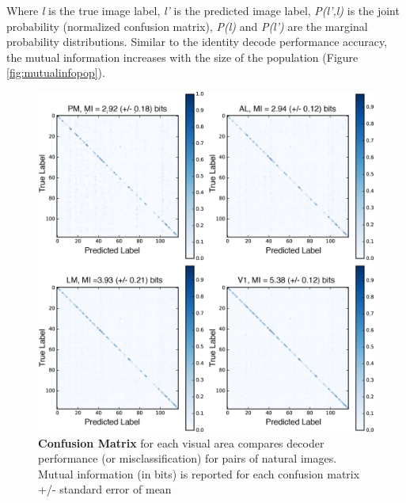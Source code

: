 Where \emph{l} is the true image label, \emph{l'} is the predicted image label, \emph{P(l',l)} is the joint probability (normalized confusion matrix), \emph{P(l)} and \emph{P(l')} are the marginal probability distributions. Similar to the identity decode performance accuracy, the mutual information increases with the size of the population (Figure \ref{fig:mutualinfopop}).\par 
\begin{figure}
  \centering
     \includegraphics[width=\textwidth]{Figures/chapter5/confusion.png}
  \caption[Confusion Matrix]{\textbf{Confusion Matrix} for each visual area compares decoder performance (or misclassification) for pairs of natural images. Mutual information (in bits) is reported for each confusion matrix +/- standard error of mean}
   \label{fig:confusion}
\end{figure}
